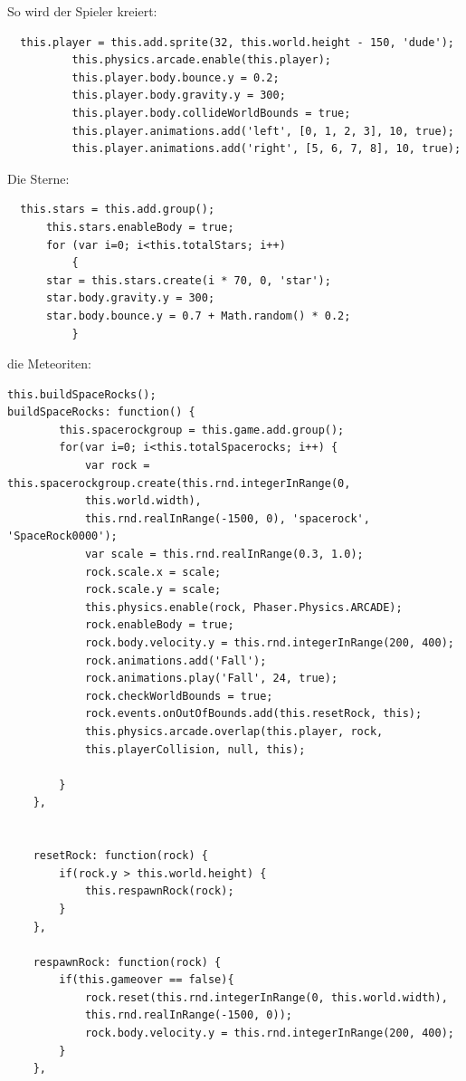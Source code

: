\documentclass{article}
\begin{document}
So wird der Spieler kreiert:

\begin{lstlisting}
  this.player = this.add.sprite(32, this.world.height - 150, 'dude');
          this.physics.arcade.enable(this.player);
          this.player.body.bounce.y = 0.2;
          this.player.body.gravity.y = 300;
          this.player.body.collideWorldBounds = true;
          this.player.animations.add('left', [0, 1, 2, 3], 10, true);
          this.player.animations.add('right', [5, 6, 7, 8], 10, true);
\end{lstlisting}


Die Sterne:


\begin{lstlisting}
  this.stars = this.add.group();
      this.stars.enableBody = true;
      for (var i=0; i<this.totalStars; i++)
          {
      star = this.stars.create(i * 70, 0, 'star');
      star.body.gravity.y = 300;
      star.body.bounce.y = 0.7 + Math.random() * 0.2;
          }
\end{lstlisting}

die Meteoriten:

\begin{lstlisting}
this.buildSpaceRocks();
buildSpaceRocks: function() {
        this.spacerockgroup = this.game.add.group();
        for(var i=0; i<this.totalSpacerocks; i++) {
            var rock = this.spacerockgroup.create(this.rnd.integerInRange(0,
            this.world.width),
            this.rnd.realInRange(-1500, 0), 'spacerock', 'SpaceRock0000');
            var scale = this.rnd.realInRange(0.3, 1.0);
            rock.scale.x = scale;
            rock.scale.y = scale;
            this.physics.enable(rock, Phaser.Physics.ARCADE);
            rock.enableBody = true;
            rock.body.velocity.y = this.rnd.integerInRange(200, 400);
            rock.animations.add('Fall');
            rock.animations.play('Fall', 24, true);
            rock.checkWorldBounds = true;
            rock.events.onOutOfBounds.add(this.resetRock, this);
            this.physics.arcade.overlap(this.player, rock,
            this.playerCollision, null, this);

        }
    },


    resetRock: function(rock) {
        if(rock.y > this.world.height) {
            this.respawnRock(rock);
        }
    },

    respawnRock: function(rock) {
        if(this.gameover == false){
            rock.reset(this.rnd.integerInRange(0, this.world.width),
            this.rnd.realInRange(-1500, 0));
            rock.body.velocity.y = this.rnd.integerInRange(200, 400);
        }
    },

\end{lstlisting}
\end{document}

